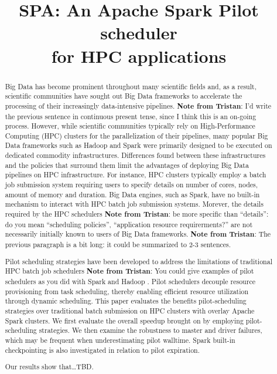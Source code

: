\documentclass{IEEEtran}
\newcommand{\tristan}[1]{\color{red}\textbf{Note from Tristan}:
      #1 \color{black}}
\newcommand{\TG}[1]{\tristan{#1}}
\begin{document}
\title{SPA: An Apache Spark Pilot scheduler\\ for HPC applications}
\author{
    \IEEEauthorblockA{}
}
\maketitle

\begin{abstract}
    Big Data has become prominent throughout many scientific fields and, as a
    result, scientific communities have sought out Big Data frameworks to 
    accelerate the processing of their increasingly data-intensive pipelines.
    \TG{I'd write the previous sentence in continuous present tense, since I think
    this is an on-going process.}
    However, while scientific communities typically rely on High-Performance 
    Computing (HPC) clusters for the parallelization of their pipelines, many 
    popular Big Data frameworks such as Hadoop and Spark were primarily designed
    to be executed on dedicated commodity infrastructures. Differences found between
    these infrastructures and the policies that surround them limit the advantages
    of deploying Big Data pipelines on HPC infrastructure. For instance, HPC
    clusters typically employ a batch job submission system requiring users to
    specify details on number of cores, nodes, amount of memory and duration.
    Big Data engines, such as Spark, have no built-in mechanism to interact with
    HPC batch job submission systems. Morever, the details required by the HPC
    schedulers \TG{be more specific than ``details'': do you mean ``scheduling policies'',
    ``application resource requirerments?''
    } are not necessarily initially known to users of Big Data frameworks.
    \TG{The previous paragraph is a bit long: it could be summarized to 2-3
    sentences.}

    Pilot scheduling strategies have been developed to address the limitations 
    of traditional HPC batch job schedulers \TG{You could give examples of pilot schedulers as you did with Spark and Hadoop}.
    Pilot schedulers decouple resource
    provisioning from task scheduling, thereby enabling efficient resource
    utilization through dynamic scheduling. This paper evaluates the benefits 
    pilot-scheduling strategies over traditional batch submission
    on HPC clusters with overlay Apache Spark clusters. We first evaluate the
    overall speedup brought on by employing pilot-scheduling strategies. We then
    examine the robustness to master and driver failures, which may be frequent 
    when underestimating pilot walltime. Spark built-in checkpointing is also 
    investigated in relation to pilot expiration.

    Our results show that\ldots TBD.
\end{abstract}
\end{document}
